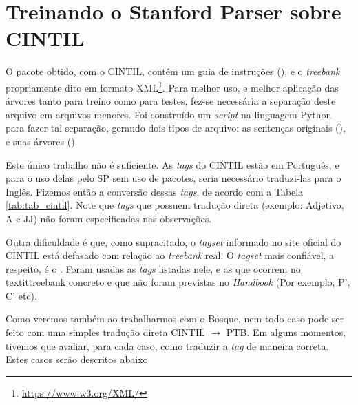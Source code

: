 
\section{Treinando o Stanford Parser sobre CINTIL}
\label{treinando_sp_cintil}
O pacote obtido, com o CINTIL, contém um guia de instruções (), e o \textit{treebank} propriamente dito em formato XML\footnote{\url{https://www.w3.org/XML/}}. Para melhor uso, e melhor aplicação das árvores tanto para treino como para testes, fez-se necessária a separação deste arquivo em arquivos menores. Foi construído um \textit{script} na linguagem Python para fazer tal separação, gerando dois tipos de arquivo: as sentenças originais (), e suas árvores ().

Este único trabalho não é suficiente. As \textit{tags} do CINTIL estão em Português, e para o uso delas pelo SP sem uso de pacotes, seria necessário traduzi-las para o Inglês. Fizemos então a conversão dessas \textit{tags}, de acordo com a Tabela \ref{tab:tab_cintil}. Note que \textit{tags} que possuem tradução direta (exemplo: Adjetivo, A e JJ) não foram especificadas nas observações.

Outra dificuldade é que, como supracitado, o \textit{tagset} informado no site oficial do CINTIL está defasado com relação ao \textit{treebank} real. O \textit{tagset} mais confiável, a respeito, é o  . Foram usadas as \textit{tags} listadas nele, e as que ocorrem no textit{treebank} concreto e que não foram previstas no \textit{Handbook} (Por exemplo, P’, C’ etc).

\begin{center}

\end{center}

Como veremos também ao trabalharmos com o Bosque, nem todo caso pode ser feito com uma simples tradução direta CINTIL $\rightarrow$ PTB. Em alguns momentos, tivemos que avaliar, para cada caso, como traduzir a \textit{tag} de maneira correta. Estes casos serão descritos abaixo
